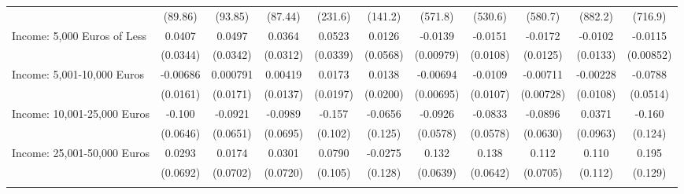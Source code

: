 {\begin{tabular}{l*{10}{c}}
            &     (89.86)         &     (93.85)         &     (87.44)         &     (231.6)         &     (141.2)         &     (571.8)         &     (530.6)         &     (580.7)         &     (882.2)         &     (716.9)         \\
\addlinespace
Income: 5,000 Euros of Less&      0.0407         &      0.0497         &      0.0364         &      0.0523         &      0.0126         &     -0.0139         &     -0.0151         &     -0.0172         &     -0.0102         &     -0.0115         \\
            &    (0.0344)         &    (0.0342)         &    (0.0312)         &    (0.0339)         &    (0.0568)         &   (0.00979)         &    (0.0108)         &    (0.0125)         &    (0.0133)         &   (0.00852)         \\
\addlinespace
Income: 5,001-10,000 Euros&    -0.00686         &    0.000791         &     0.00419         &      0.0173         &      0.0138         &    -0.00694         &     -0.0109         &    -0.00711         &    -0.00228         &     -0.0788         \\
            &    (0.0161)         &    (0.0171)         &    (0.0137)         &    (0.0197)         &    (0.0200)         &   (0.00695)         &    (0.0107)         &   (0.00728)         &    (0.0108)         &    (0.0514)         \\
\addlinespace
Income: 10,001-25,000 Euros&      -0.100         &     -0.0921         &     -0.0989         &      -0.157         &     -0.0656         &     -0.0926         &     -0.0833         &     -0.0896         &      0.0371         &      -0.160         \\
            &    (0.0646)         &    (0.0651)         &    (0.0695)         &     (0.102)         &     (0.125)         &    (0.0578)         &    (0.0578)         &    (0.0630)         &    (0.0963)         &     (0.124)         \\
\addlinespace
Income: 25,001-50,000 Euros&      0.0293         &      0.0174         &      0.0301         &      0.0790         &     -0.0275         &       0.132\sym{*}  &       0.138\sym{*}  &       0.112         &       0.110         &       0.195         \\
            &    (0.0692)         &    (0.0702)         &    (0.0720)         &     (0.105)         &     (0.128)         &    (0.0639)         &    (0.0642)         &    (0.0705)         &     (0.112)         &     (0.129)         \\
\addlinespace

\end{tabular}}
